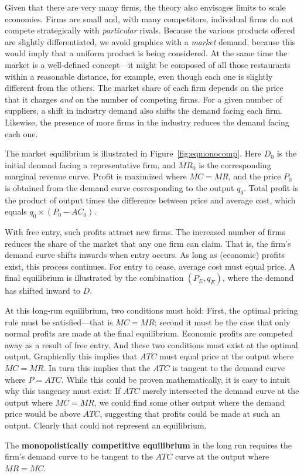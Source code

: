 Given that there are very many firms, the theory also envisages limits to
scale economies. Firms are small and, with many competitors, individual
firms do not compete strategically with \textit{particular} rivals. Because
the various products offered are slightly differentiated, we avoid graphics
with a \textit{market} demand, because this would imply that a uniform
product is being considered. At the same time the market is a well-defined
concept---it might be composed of all those restaurants within a reasonable
distance, for example, even though each one is slightly different from the
others. The market share of each firm depends on the price that it charges 
\textit{and} on the number of competing firms. For a given number of
suppliers, a shift in industry demand also shifts the demand facing each
firm. Likewise, the presence of more firms in the industry reduces the
demand facing each one.

\newhtmlpage

The market equilibrium is illustrated in Figure~\ref{fig:eqmonocomp}. Here 
$D_0$ is the initial demand facing a representative firm, and $MR_0$ is the
corresponding marginal revenue curve. Profit is maximized where $MC=MR$, and
the price $P_0$ is obtained from the demand curve corresponding to the
output $q_0$. Total profit is the product of output times the difference
between price and average cost, which equals $q_0\times(P_0-AC_0)$.



\newhtmlpage

With free entry, such profits attract new firms. The increased number of
firms reduces the share of the market that any one firm can claim. That is,
the firm's demand curve shifts inwards when entry occurs. As long as
(economic) profits exist, this process continues. For entry to cease,
average cost must equal price. A final equilibrium is illustrated by the
combination $(P_{E},q_{E})$, where the demand has shifted inward to $D$.

At this long-run equilibrium, two conditions must hold: First, the optimal
pricing rule must be satisfied---that is $MC=MR$; second it must be the case
that only normal profits are made at the final equilibrium. Economic profits
are competed away as a result of free entry. And these two conditions must
exist at the optimal output. Graphically this implies that $ATC$ must equal
price at the output where $MC=MR$. In turn this implies that the $ATC$ is
tangent to the demand curve where $P=ATC$. While this could be proven
mathematically, it is easy to intuit why this tangency must exist: If $ATC$
merely intersected the demand curve at the output where $MC=MR$, we could
find some other output where the demand price would be above $ATC$,
suggesting that profits could be made at such an output. Clearly that could
not represent an equilibrium.

\begin{DefBox}
	The \textbf{monopolistically competitive equilibrium} in the long run requires the firm's demand curve to be tangent to the $ATC$ curve at the output where $MR=MC$.
\end{DefBox}